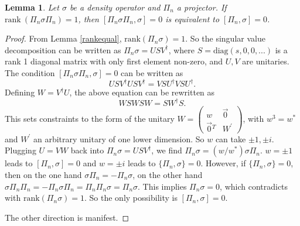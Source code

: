 \documentclass[11pt]{article}
\newtheorem{lemma}{Lemma}
\theoremstyle{definition}
\begin{document}
\begin{appendix}
\begin{lemma}\label{commutatorequal}
Let $\sigma$ be a density operator and $\Pi_n$ a projector. If $\text{rank}~(\Pi_n\sigma\Pi_n)=1$, then $[\Pi_n \sigma \Pi_n,\sigma]=0$ is equivalent to $[\Pi_n ,\sigma]=0$.
\end{lemma}
\begin{proof}
From Lemma \ref{rankequal}, $\text{rank}(\Pi_n\sigma)=1$. So the singular value decomposition can be written as $\Pi_n\sigma=U S V^{\dagger}$, where $S=\text{diag}(s,0,0,...)$ is a rank 1 diagonal matrix with only first element non-zero, and $U, V$ are unitaries. The condition $[\Pi_n \sigma \Pi_n,\sigma]=0$ can be written as 
\begin{equation*}
    U S V^{\dagger} U S V^{\dagger}= V S U^{\dagger} V S U^{\dagger}.
\end{equation*}
Defining $W=V^\dagger U$, the above equation can be rewritten as
\begin{equation*}
    W S W S W= SW^\dagger S.
\end{equation*}
This sets constraints to the form of the unitary $W=\begin{pmatrix}w&\vec 0\\ \vec 0 { }^T& W^\prime\end{pmatrix}$, with $w^3=w^*$ and $W^\prime$ an arbitrary unitary of one lower dimension. So $w$ can take $\pm 1, \pm i$. Plugging $U=V W$ back into $\Pi_n \sigma=U S V^\dagger$, we find $\Pi_n \sigma=(w/w^*)\sigma \Pi_n$. $w=\pm1$ leads to $[\Pi_n,\sigma]=0$ and $w=\pm i$ leads to $\{\Pi_n,\sigma\}=0$. However, if $\{\Pi_n,\sigma\}=0$, then on the one hand $\sigma \Pi_n=-\Pi_n \sigma$, on the other hand $\sigma \Pi_n \Pi_n=-\Pi_n \sigma \Pi_n=\Pi_n \Pi_n \sigma=\Pi_n \sigma$. This implies $\Pi_n\sigma=0$, which contradicts with $\text{rank}(\Pi_n\sigma)=1$. So the only possibility is $[\Pi_n,\sigma]=0$.

The other direction is manifest.
\end{proof}


\end{appendix}







\end{document}
